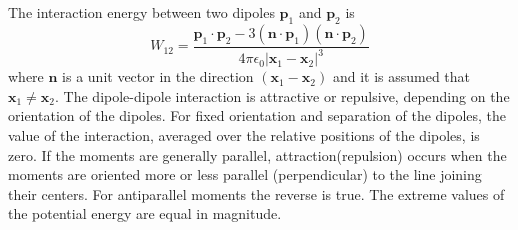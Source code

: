 \documentclass[12pt,a4paper]{article}
\renewcommand{\vec}[1]{\boldsymbol{#1}}
\begin{document}
The interaction energy between two dipoles $\vec{p}_1$ and $\vec{p}_2$ is
\begin{equation}
W_{12} = \frac{\vec{p}_1\cdot \vec{p}_2 -3(\vec{n}\cdot \vec{p}_1)(\vec{n}\cdot \vec{p}_2)}{4\pi \epsilon_0|\vec{x}_1 -\vec{x}_2|^3}
\end{equation}
where $\vec{n}$ is a unit vector in the direction $(\vec{x}_1 -\vec{x}_2)$ and it is assumed that $\vec{x}_1 \neq \vec{x}_2$. The dipole-dipole interaction is attractive or repulsive, depending on the orientation of the dipoles. For fixed orientation and separation of the dipoles, the value of the interaction, averaged over the relative positions of the dipoles, is zero. If the moments are generally parallel, attraction(repulsion) occurs when the moments are oriented more or less parallel (perpendicular) to the line joining their centers. For antiparallel moments the reverse is true. The extreme values of the potential energy are equal in magnitude.
\end{document}
